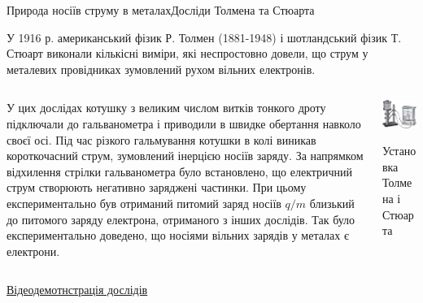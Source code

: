 \documentclass[onlytextwidth]{beamer}
\begin{document}
\begin{frame}{Природа носіїв струму в металах}{Досліди Толмена та Стюарта}\small
	\begin{block}{}\justifying
		У 1916 р. американський фізик Р. Толмен (1881-1948) і шотландський фізик Т. Стюарт виконали
		кількісні виміри, які неспростовно довели, що струм у металевих провідниках зумовлений рухом
		вільних електронів.
	\end{block}
	\begin{columns}
		\begin{column}{0.65\linewidth}
			\begin{block}{}\justifying
				У цих дослідах котушку з великим числом витків тонкого дроту підключали до
				гальванометра і приводили в швидке обертання навколо своєї осі. Під час різкого
				гальмування котушки в колі виникав короткочасний струм, зумовлений інерцією носіїв
				заряду. За напрямком відхилення стрілки гальванометра було встановлено, що
				\alert{електричний струм створюють негативно заряджені частинки}. При цьому
				експериментально був отриманий питомий заряд носіїв $q/m$ близький до питомого
				заряду електрона, отриманого з інших дослідів. Так було експериментально доведено,
				що носіями вільних зарядів у металах є електрони.
			\end{block}
		\end{column}
		\hfill
		\begin{column}{0.3\linewidth}\centering
			\includegraphics[width=\linewidth]{exptommstuart}
			\begin{block}{}\centering
				Установка Толмена і Стюарта
			\end{block}
		\end{column}
	\end{columns}
	\begin{block}{}
		\href{https://www.youtube.com/watch?v=nVwquffMk44}{\color{blue}Відеодемотнстрація дослідів}
	\end{block}
\end{frame}
\end{document}
